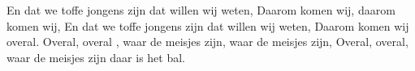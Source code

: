 \beginverse*
En dat we toffe jongens zijn dat willen wij weten,
Daarom komen wij, daarom komen wij,
En dat we toffe jongens zijn dat willen wij weten,
Daarom komen wij overal. 
Overal, overal , waar de meisjes zijn, waar de meisjes zijn,
Overal, overal, waar de meisjes zijn daar is het bal. 
\endverse
\endsong 